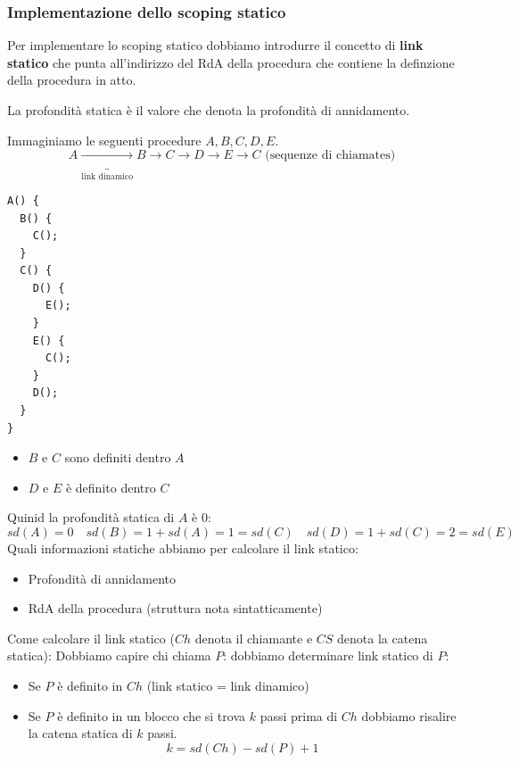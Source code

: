 \documentclass[a4paper]{article}
\begin{document}

\subsubsection{Implementazione dello scoping statico} 

Per implementare lo scoping statico dobbiamo introdurre il concetto di 
\textbf{link statico} che punta all'indirizzo del RdA della procedura 
che contiene la definzione della procedura in atto.

{
  La profondità statica è il valore che denota la profondità di annidamento.
}

\begin{Example}{}{}
Immaginiamo le seguenti procedure $A, B, C, D, E$. 
\[
  A \underbrace{\rightarrow}_{\text{link dinamico}} B \rightarrow C \rightarrow D \rightarrow E \rightarrow C \text{ (sequenze di chiamates)}
\]
\begin{lstlisting}[escapechar=|, basicstyle=\ttfamily, columns=fullflexible, keepspaces=true]
A() {
  B() {
    C();
  }
  C() {
    D() {
      E();
    }
    E() {
      C();
    }
    D();
  }
}
\end{lstlisting}
\noindent
\begin{itemize}
  \item $B$ e $C$ sono definiti dentro $A$ 
  \item $D$ e $E$ è definito dentro $C$
\end{itemize}
Quinid la profondità statica di $A$ è 0:
\[
sd(A) = 0 \quad sd(B) = 1 + sd(A) = 1 = sd(C) \quad sd(D) = 1 + sd(C) = 2 = sd(E)
\]
Quali informazioni statiche abbiamo per calcolare il link statico:
\begin{itemize}
  \item Profondità di annidamento 
  \item RdA della procedura (struttura nota sintatticamente)
\end{itemize}
Come calcolare il link statico ($Ch$ denota il chiamante e $CS$ denota la catena statica):
Dobbiamo capire chi chiama $P$: dobbiamo determinare link statico di $P$:
\begin{itemize}
  \item Se $P$ è definito in $Ch$ (link statico = link dinamico)
  \item Se $P$ è definito in un blocco che si trova $k$ passi prima di 
  $Ch$ dobbiamo risalire la catena statica di $k$ passi.
  \[
    k = sd(Ch) - sd(P) + 1
\]
\end{itemize}
\end{Example}
\end{document}
